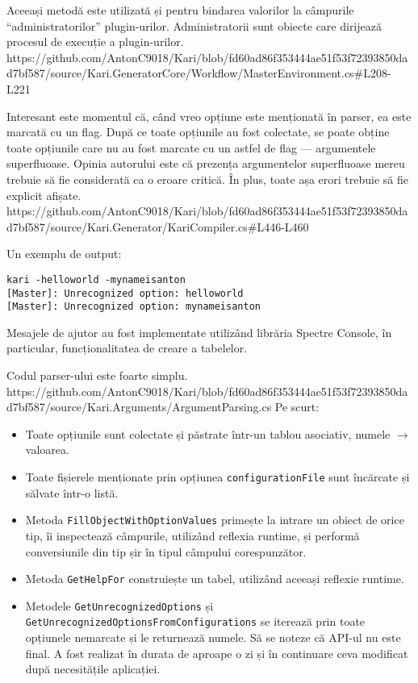 \documentclass[a4paper,12pt]{report}
\begin{document}
Aceeași metodă este utilizată și pentru bindarea valorilor la câmpurile ``administratorilor'' plugin-urilor.
Administratorii sunt obiecte care dirijează procesul de execuție a plugin-urilor.
https://github.com/AntonC9018/Kari/blob/fd60ad86f353444ae51f53f72393850dad7bf587/source/Kari.GeneratorCore/Workflow/MasterEnvironment.cs#L208-L221


Interesant este momentul că, când vreo opțiune este menționată în parser, ea este marcată cu un flag.
După ce toate opțiunile au fost colectate, se poate obține toate opțiunile care nu au fost marcate cu un astfel de flag --- argumentele superfluoase.
Opinia autorului este că prezența argumentelor superfluoase mereu trebuie să fie considerată ca o eroare critică.
În plus, toate așa erori trebuie să fie explicit afișate.
https://github.com/AntonC9018/Kari/blob/fd60ad86f353444ae51f53f72393850dad7bf587/source/Kari.Generator/KariCompiler.cs#L446-L460

Un exemplu de output:

\begin{verbatim}
kari -helloworld -mynameisanton
[Master]: Unrecognized option: helloworld
[Master]: Unrecognized option: mynameisanton
\end{verbatim}


Mesajele de ajutor au fost implementate utilizând librăria Spectre Console\cite{spectre_console_github}, în particular, funcționalitatea de creare a tabelelor.


Codul parser-ului este foarte simplu.
https://github.com/AntonC9018/Kari/blob/fd60ad86f353444ae51f53f72393850dad7bf587/source/Kari.Arguments/ArgumentParsing.cs
Pe scurt:

\begin{itemize}
  \item Toate opțiunile sunt colectate și păstrate într-un tablou asociativ, numele $\rightarrow$ valoarea.
  \item Toate fișierele menționate prin opțiunea \texttt{configurationFile} sunt încărcate și sălvate într-o listă.
  \item Metoda \texttt{FillObjectWithOptionValues} primește la intrare un obiect de orice tip, îi inspectează câmpurile, utilizând reflexia runtime, și performă conversiunile din tip șir în tipul câmpului corespunzător.
  \item Metoda \texttt{GetHelpFor} construiește un tabel, utilizând aceeași reflexie runtime.
  \item Metodele \texttt{GetUnrecognizedOptions} și \texttt{GetUnrecognizedOptionsFromConfigurations} se iterează prin toate opțiunele nemarcate și le returnează numele.
  Să se noteze că \ac{API}-ul nu este final.
  A fost realizat în durata de aproape o zi și în continuare ceva modificat după necesitățile aplicației.
\end{itemize}
\end{document}
